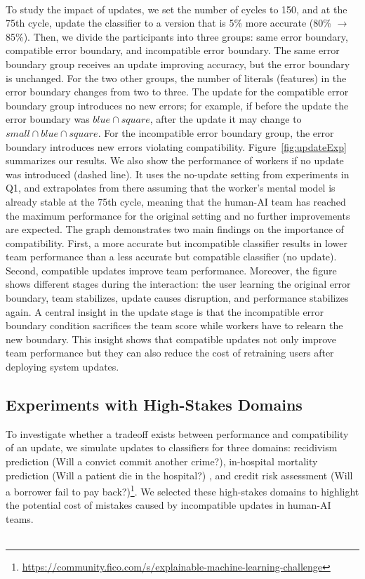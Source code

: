 \documentclass[letterpaper]{article} %
\newcommand{\?}{\mbox{?}}
\begin{document}
\\
\noindent To study the impact of updates, we set the number of cycles to 150, and at the 75th cycle, update the classifier to a version that is 5\% more accurate (80\% $\rightarrow$ 85\%). Then, we divide the participants into three groups: same error boundary,
compatible error boundary, and incompatible error boundary. The same error boundary group receives an update improving accuracy, but the  error boundary is unchanged. For the two other groups, the number of literals (features) in the error boundary changes from two to three. The update for the compatible error boundary group introduces no new errors; for example, if before the update the error boundary was $blue \cap square$, after the update it may change to $small \cap blue \cap square$. For the incompatible error boundary group, the error boundary introduces new errors violating compatibility. Figure~\ref{fig:updateExp} summarizes our results. We also show the performance of workers if no update was introduced (dashed line). It uses the no-update setting from experiments in Q1, and extrapolates from there assuming that the worker's mental model is already stable at the 75th cycle, meaning that the human-AI team has reached the maximum performance for the original setting and no further improvements are expected. The graph demonstrates two main findings on the importance of compatibility. First, a more accurate but incompatible classifier  results in lower team performance than a less accurate but compatible classifier (no update). Second, compatible updates improve team performance. Moreover, the figure shows different stages during the interaction: the user learning the original error boundary, team stabilizes, update causes disruption, and performance stabilizes again. A central insight in the update stage is that the incompatible error boundary condition sacrifices the team score while workers have to relearn the new boundary. This insight shows that compatible updates not only improve team performance but they can also reduce the cost of retraining users after deploying system updates.  


\subsection{Experiments with  High-Stakes Domains}
 To investigate whether a tradeoff exists between  performance and compatibility of an update, we simulate updates to classifiers for three domains: recidivism prediction (Will a convict commit another crime?)\cite{angwin2016machine}, in-hospital mortality prediction (Will a patient die in the hospital?) \cite{johnson2016mimic,harutyunyan2017multitask}, and credit risk assessment (Will a borrower fail to pay back?)\footnote{\url{https://community.fico.com/s/explainable-machine-learning-challenge}}. We selected these high-stakes domains to highlight the potential cost of mistakes caused by incompatible updates in human-AI teams.\\\\
\end{document}
